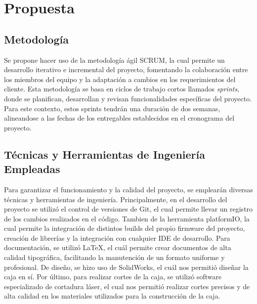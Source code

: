 \gdef\loremipsum{Lorem ipsum dolor sit amet, consectetur adipiscing elit, sed do eiusmod tempor incididunt ut labore et dolore magna aliqua. Ut enim ad minim veniam, quis nostrud exercitation ullamco laboris nisi ut aliquip ex ea commodo consequat. Duis aute irure dolor in reprehenderit in voluptate velit esse cillum dolore eu fugiat nulla pariatur. Excepteur sint occaecat cupidatat non proident, sunt in culpa qui officia deserunt mollit anim id est laborum.\par}

\section{Propuesta}

\subsection{Metodología}
Se propone hacer uso de la metodología ágil SCRUM, la cual permite un desarrollo iterativo e incremental del proyecto, fomentando la colaboración entre los miembros del equipo y la adaptación a cambios en los requerimientos del cliente. Esta metodología se basa en ciclos de trabajo cortos llamados \textit{sprints}, donde se planifican, desarrollan y revisan funcionalidades específicas del proyecto. Para este contexto, estos sprints tendrán una duración de dos semanas, alineandose a las fechas de los entregables establecidos en el cronograma del proyecto.

\subsection{Técnicas y Herramientas de Ingeniería Empleadas}
Para garantizar el funcionamiento y la calidad del proyecto, se emplearán diversas técnicas y herramientas de ingeniería. Principalmente, en el desarrollo del proyecto se utilizó el control de versiones de Git, el cual permite llevar un registro de los cambios realizados en el código. Tambien de la herramienta platformIO, la cual permite la integración de distintos builds del propio firmware del proyecto, creación de librerías y la integración con cualquier IDE de desarrollo. Para documentación, se utilizó \LaTeX, el cuál permite crear documentos de alta calidad tipográfica, facilitando la manutención de un formato uniforme y profesional. De diseño, se hizo uso de SolidWorks, el cuál nos permitió diseñar la caja en sí. Por último, para realizar cortes de la caja, se utilizó software especializado de cortadura láser, el cual nos permitió realizar cortes precisos y de alta calidad en los materiales utilizados para la construcción de la caja.

